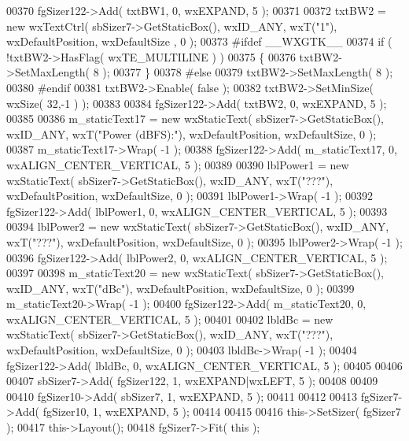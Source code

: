 \begin{DoxyCode}
00370     fgSizer122->Add( txtBW1, 0, wxEXPAND, 5 );
00371     
00372     txtBW2 = \textcolor{keyword}{new} wxTextCtrl( sbSizer7->GetStaticBox(), wxID\_ANY, wxT(\textcolor{stringliteral}{"1"}), wxDefaultPosition, wxDefaultSize
      , 0 );
00373 \textcolor{preprocessor}{    #ifdef \_\_WXGTK\_\_}
00374     \textcolor{keywordflow}{if} ( !txtBW2->HasFlag( wxTE\_MULTILINE ) )
00375     \{
00376     txtBW2->SetMaxLength( 8 );
00377     \}
00378 \textcolor{preprocessor}{    #else}
00379     txtBW2->SetMaxLength( 8 );
00380 \textcolor{preprocessor}{    #endif}
00381     txtBW2->Enable( \textcolor{keyword}{false} );
00382     txtBW2->SetMinSize( wxSize( 32,-1 ) );
00383     
00384     fgSizer122->Add( txtBW2, 0, wxEXPAND, 5 );
00385     
00386     m_staticText17 = \textcolor{keyword}{new} wxStaticText( sbSizer7->GetStaticBox(), wxID\_ANY, wxT(\textcolor{stringliteral}{"Power (dBFS):"}), 
      wxDefaultPosition, wxDefaultSize, 0 );
00387     m_staticText17->Wrap( -1 );
00388     fgSizer122->Add( m_staticText17, 0, wxALIGN\_CENTER\_VERTICAL, 5 );
00389     
00390     lblPower1 = \textcolor{keyword}{new} wxStaticText( sbSizer7->GetStaticBox(), wxID\_ANY, wxT(\textcolor{stringliteral}{"???"}), wxDefaultPosition, 
      wxDefaultSize, 0 );
00391     lblPower1->Wrap( -1 );
00392     fgSizer122->Add( lblPower1, 0, wxALIGN\_CENTER\_VERTICAL, 5 );
00393     
00394     lblPower2 = \textcolor{keyword}{new} wxStaticText( sbSizer7->GetStaticBox(), wxID\_ANY, wxT(\textcolor{stringliteral}{"???"}), wxDefaultPosition, 
      wxDefaultSize, 0 );
00395     lblPower2->Wrap( -1 );
00396     fgSizer122->Add( lblPower2, 0, wxALIGN\_CENTER\_VERTICAL, 5 );
00397     
00398     m_staticText20 = \textcolor{keyword}{new} wxStaticText( sbSizer7->GetStaticBox(), wxID\_ANY, wxT(\textcolor{stringliteral}{"dBc"}), wxDefaultPosition, 
      wxDefaultSize, 0 );
00399     m_staticText20->Wrap( -1 );
00400     fgSizer122->Add( m_staticText20, 0, wxALIGN\_CENTER\_VERTICAL, 5 );
00401     
00402     lbldBc = \textcolor{keyword}{new} wxStaticText( sbSizer7->GetStaticBox(), wxID\_ANY, wxT(\textcolor{stringliteral}{"???"}), wxDefaultPosition, 
      wxDefaultSize, 0 );
00403     lbldBc->Wrap( -1 );
00404     fgSizer122->Add( lbldBc, 0, wxALIGN\_CENTER\_VERTICAL, 5 );
00405     
00406     
00407     sbSizer7->Add( fgSizer122, 1, wxEXPAND|wxLEFT, 5 );
00408     
00409     
00410     fgSizer10->Add( sbSizer7, 1, wxEXPAND, 5 );
00411     
00412     
00413     fgSizer7->Add( fgSizer10, 1, wxEXPAND, 5 );
00414     
00415     
00416     this->SetSizer( fgSizer7 );
00417     this->Layout();
00418     fgSizer7->Fit( \textcolor{keyword}{this} );

\end{DoxyCode}
